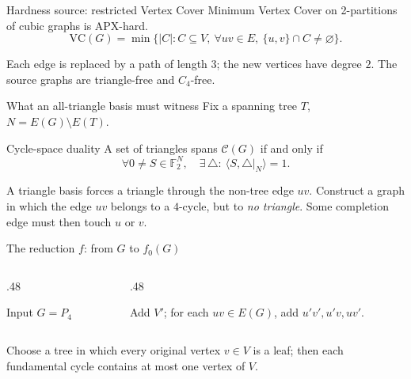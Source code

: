 \begin{frame}{Hardness source: restricted Vertex Cover}
  Minimum Vertex Cover on 2-partitions of cubic graphs is APX-hard.
 \[ \mathrm{VC}(G)=\min\{|C|: C\subseteq V,\ \forall uv\in E,\ \{u,v\}\cap C\ne\varnothing\}.\]
 \begin{center}
  \resizebox{.63\textwidth}{!}{\TwoPartitionFig}
 \end{center}
 \small Each edge is replaced by a path of length \(3\); the new vertices have degree \(2\). The source graphs are triangle-free and \(C_4\)-free.
\end{frame}


\begin{frame}{What an all-triangle basis must witness}
 Fix a spanning tree $T$, $N=E(G)\setminus E(T)$.
 \begin{block}{Cycle-space duality}
 A set of triangles spans $\mathcal C(G)$ if and only if
 \[\forall 0\neq S\in\mathbb F_2^N,\quad \exists\,\triangle:\ \langle S,\triangle|_N\rangle=1.\]
 \end{block}
 \vspace{.2cm}
  A triangle basis forces a triangle through the non-tree edge $uv$.
 \vspace{.12cm}
  Construct a graph in which the edge $uv$ belongs to a $4$-cycle, but to \emph{no triangle}. Some completion edge must then touch $u$ or $v$.
\end{frame}


\begin{frame}{The reduction \(f\): from \(G\) to \(f_0(G)\)}
 \begin{columns}[T,onlytextwidth]
  \begin{column}{.48\textwidth}
   \begin{center}\end{center}
   \centering\small Input \(G=P_4\)
  \end{column}
  \begin{column}{.48\textwidth}
   \begin{center}\end{center}
   \centering\small Add \(V'\); for each \(uv\in E(G)\), add \(u'v',u'v,uv'\).
  \end{column}
 \end{columns}
 \vspace{.1cm}
  Choose a tree in which every original vertex \(v\in V\) is a leaf; then each fundamental cycle contains at most one vertex of \(V\).
\end{frame}


